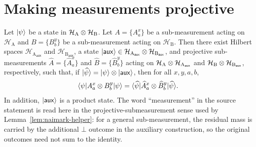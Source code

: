 \chapter{Making measurements projective}
\label{chap:projective}

\begin{theorem}\label{thm:naimark}
	\leanok
	Let $\lvert \psi \rangle$ be a state in $\mathcal H_{\mathrm A} \otimes \mathcal H_{\mathrm B}$.
	Let $A = \{A^x_a\}$ be a sub-measurement acting on $\mathcal H_{\mathrm A}$
	and $B=\{B^y_b\}$ be a sub-measurement acting on $\mathcal H_{\mathrm B}$.
	Then there exist Hilbert spaces $\mathcal H_{\mathrm A_{\mathsf{aux}}}$ and $\mathcal H_{\mathrm B_{\mathsf{aux}}}$,
	a state $\lvert \mathsf{aux} \rangle \in \mathcal H_{\mathrm A_{\mathsf{aux}}} \otimes \mathcal H_{\mathrm B_{\mathsf{aux}}}$,
	and projective sub-measurements $\widehat{A} = \{\widehat{A}^x_a\}$ and $\widehat{B}=\{\widehat{B}^y_b\}$
	acting on $\mathcal H_{\mathrm A} \otimes \mathcal H_{\mathrm A_{\mathsf{aux}}}$
	and $\mathcal H_{\mathrm B} \otimes \mathcal H_{\mathrm B_{\mathsf{aux}}}$, respectively,
	such that, if $\lvert \widehat{\psi} \rangle = \lvert \psi \rangle \otimes \lvert \mathsf{aux} \rangle$, then for all $x,y,a,b$,
	\[
		\langle \psi \rvert A^x_a \otimes B^y_b \lvert \psi \rangle
		=
		\langle \widehat{\psi} \rvert \widehat{A}^x_a \otimes \widehat{B}^y_b \lvert \widehat{\psi} \rangle.
	\]
	In addition, $\lvert \mathsf{aux} \rangle$ is a product state.
	The word ``measurement'' in the source statement is read here in the
	projective-submeasurement sense used by Lemma~\ref{lem:naimark-helper}: for a
	general sub-measurement, the residual mass is carried by the additional
	\(\bot\) outcome in the auxiliary construction, so the original outcomes need
	not sum to the identity.
\end{theorem}
